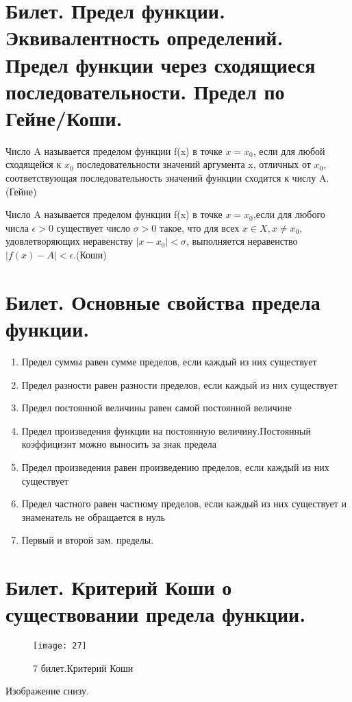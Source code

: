 \documentclass[12pt]{article}
\begin{document}
	\section{Билет. Предел функции. Эквивалентность определений. Предел функции через сходящиеся последовательности. Предел по Гейне/Коши.}
	
	Число A называется пределом функции f(x) в точке $x=x_0$, если для любой сходящейся к $x_0$ последовательности значений аргумента x, отличных от $x_0$, соответствующая последовательность значений функции сходится к числу A.(Гейне)
	
	Число A называется пределом функции f(x) в точке $x=x_0$,если для любого числа $\epsilon>0$ существует число $\sigma>0$ такое, что для всех $ x \in X , x \not= x_0$, удовлетворяющих неравенству $|x-x_0|<\sigma$, выполняется неравенство $|f(x)-A|<\epsilon$.(Коши)
	
	\section{Билет. Основные свойства предела функции.}
	
	\begin{enumerate}
		\item Предел суммы равен сумме пределов, если каждый из них существует
		\item Предел разности равен разности пределов, если каждый из них существует
		\item Предел постоянной величины равен самой постоянной величине
		\item Предел произведения функции на постоянную величину.Постоянный коэффициэнт можно выносить за знак предела
		\item Предел произведения равен произведению пределов, если каждый из них существует
		\item Предел частного равен частному пределов, если каждый из них существует и знаменатель не обращается в нуль
		\item Первый и второй зам. пределы.
		
		
		
		
	\end{enumerate}
	
	
	
	\section{Билет. Критерий Коши о существовании предела функции.}
	\begin{figure}
	\centering
	\texttt{[image: 27]}
	\caption[7 билет]{7 билет.Критерий Коши}
	\end{figure}
	Изображение снизу.
	\newpage
\end{document}
